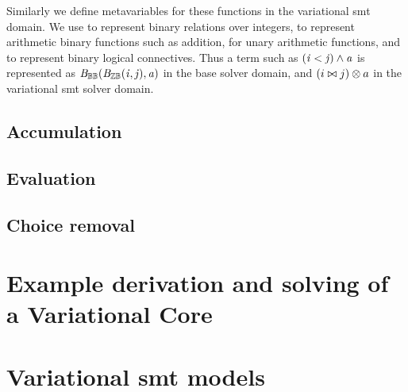 %
%
Similarly we define metavariables for these
functions in the variational \ac{smt} domain. We use \inequalities{} to
represent binary relations over integers, \integerFuncs{} to represent
arithmetic binary functions such as addition, \integerUnary{} for unary
arithmetic functions, and \boolFuncs{} to represent binary logical connectives.
Thus a term such as $\mathit{(i < j) \wedge a}$ is represented as
$\mathit{\mathit{B}_{\mathbb{B}{}\mathbb{B}}{}(\mathit{B}_{\mathbb{Z}{}\mathbb{B}}{}(i,j),a)}$ in the base solver domain, and $(i \bowtie{}{}
j) \otimes{}{} a$ in the variational \ac{smt} solver domain.

\subsection{Accumulation}


\subsection{Evaluation}


\subsection{Choice removal}


\section{Example derivation and solving of a Variational Core}


\section{Variational \ac{smt} models}


